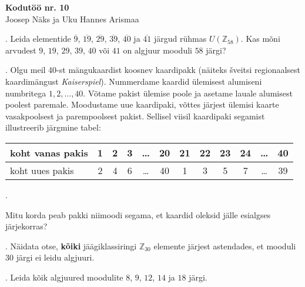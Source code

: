 \documentclass[a4paper, 10pt]{article}
\newcommand{\Z}{\mathbb{Z}}
\begin{document}
\begin{center}
\Large\textbf{Kodutöö nr. 10}\\
\small{Joosep Näks ja Uku Hannes Arismaa}
\end{center}

\bigskip

. Leida elementide $\overline {9}$, $\overline{19}$, $\overline{29}$, $\overline{39}$, $\overline{40}$ ja $\overline{41}$ j\"argud r\"uhmas $U(\Z_{58})$. Kas m\~oni arvudest $9$, $19$, $29$, $39$, $40$ või $41$ on algjuur mooduli $58$ j\"argi?

\bigskip

. Olgu meil 40-st m\"angukaardist koosnev kaardipakk (näiteks \v{s}veitsi regionaalsest kaardimängust \emph{Kaiserspiel}). 
Nummerdame kaardid \"ulemi\-se\-st alumiseni numbritega $1,2,\ldots,40$. 
V\~otame pakist \"ulemise poole ja asetame lauale alumisest 
poolest paremale. Moodustame uue kaardipaki, v\~ottes j\"arjest 
ülemisi kaarte vasakpoolsest ja parempoolsest pakist. Sellisel 
viisil kaardipaki segamist illustreerib j\"argmine tabel:
\begin{center}
\begin{tabular}{|l|c|c|c|c|c|c|c|c|c|c|c|}
\hline
koht vanas pakis & 1 & 2 & 3 & \ldots & 20 & 21 & 22 & 23 & 
24 & \ldots & 40 \\ \hline
koht uues pakis & 2 & 4 & 6 & \ldots & 40 & 1 & 3 & 5 & 
7 & \ldots & 39 \\ \hline
\end{tabular}.
\end{center}
Mitu korda peab pakki niimoodi segama, et kaardid oleksid 
j\"alle esialgses j\"arjekorras? 

\bigskip

. Näidata otse, {\bf kõiki} jäägiklassiringi $\mathbb{Z}_{30}$ elemente järjest astendades, et mooduli $30$ järgi ei leidu algjuuri. 

\bigskip

. Leida kõik algjuured moodulite $8$, $9$, $12$, $14$ ja $18$ järgi. 
\end{document}
